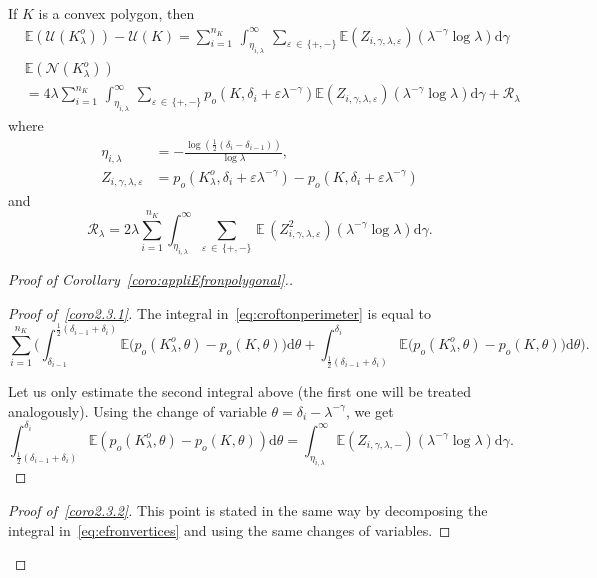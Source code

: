 \documentclass[10pt]{amsart}
\theoremstyle{definition}\newtheorem{defi}[theo]{Definition}\newtheorem{rema}[theo]{Remark}\newtheorem{exam}[theo]{Example}\newtheorem{exem}[theo]{Example}\newtheorem{nota}[theo]{Notation}
\newcommand{\cN}{\mathcal{N}}
\newcommand{\cR}{\mathcal{R}}
\newcommand{\cU}{\mathcal{U}}
\newcommand{\dd}{\mathrm{d}}
\newcommand{\E}{\mathbb{E}}
\newcommand{\eps}{\varepsilon}
\newcommand{\noi}{\noindent}
\newenvironment*{prooff}{\begin{proof}}{\let\qed\relax\end{proof}}
\newenvironment*{lastprooff}{\begin{proof}}{\end{proof}}
\begin{document}
\begin{coro}\label{coro:appliEfronpolygonal}
If $K$ is a convex polygon, then
\begin{align}
\tag{$\rm i$}\label{coro2.3.1} &\E(\cU(K_{\lambda}^o))-\cU(K) = \sum_{i=1}^{n_K}\,\int_{\eta_{i,\lambda}}^{\infty}\,\sum_{\varepsilon\,\in\,\{+,-\}} \E\left(Z_{i,\gamma,\lambda,\eps}\right)(\lambda^{-\gamma}\log \lambda)\dd\gamma \\
\tag{$\rm ii$}\label{coro2.3.2}  &\E(\cN(K_{\lambda}^o))\\
&= 4\lambda\sum_{i=1}^{n_K}\,\int_{\eta_{i,\lambda}}^{\infty}\,\sum_{\varepsilon\,\in\,\{+,-\}}p_o\left(K,\delta_i+\varepsilon\lambda^{-\gamma}\right)
\E(Z_{i,\gamma,\lambda,\eps})\left(\lambda^{-\gamma}\log\lambda\right)\dd\gamma+{\cR}_\lambda\nonumber
\end{align}
where
\begin{align*}
\eta_{i,\lambda}&=-\frac{\log \left(\frac{1}{2}(\delta_i-\delta_{i-1})\right)}{\log\lambda},\\
Z_{i,\gamma,\lambda,\eps}&= p_o\left(K_{\lambda}^o,\delta_i+\varepsilon\lambda^{-\gamma}\right)-p_o\left(K,\delta_i+\varepsilon\lambda^{-\gamma}\right)
\end{align*}
and
\begin{equation}\label{eq:defRlambdapolyg}
{\cR}_\lambda=2\lambda \sum_{i=1}^{n_K} \int_{\eta_{i,\lambda}}^{\infty} \sum_{\varepsilon\,\in\,\{+,-\}}\,\E\,\left(Z_{i,\gamma,\lambda,\eps}^2\right)\left(\lambda^{-\gamma}\log \lambda\right)\dd\gamma.
\end{equation}
\end{coro}

\begin{proof}[{Proof of Corollary~\ref{coro:appliEfronpolygonal}.}]

\begin{prooff}[{Proof of~\eqref{coro2.3.1}}]
The integral in~\eqref{eq:croftonperimeter} is equal to
\[
\sum_{i=1}^{n_K} \bigg(\int_{\delta_{i-1}}^{\frac1{2}\left(\delta_{i-1}+\delta_{i}\right)} \E\big(p_o(K_{\lambda}^o,\theta)-p_o(K,\theta)\big)\dd\theta + \int_{\frac1{2}\left(\delta_{i-1}+\delta_{i}\right)}^{\delta_{i}} \E\big(p_o(K_{\lambda}^o,\theta)-p_o(K,\theta)\big)\dd\theta\bigg).
\]

Let us only estimate the second integral above (the first one will be treated analogously). Using the change of variable $\theta=\delta_i-\lambda^{-\gamma}$, we get
\begin{equation*}\label{eq:perimpolyginterm0}
\int_{\frac1{2}\left(\delta_{i-1}+\delta_i\right)}^{\delta_i} \E(p_o(K_{\lambda}^o,\theta)-p_o(K,\theta))\dd\theta = \int_{\eta_{i,\lambda}}^{\infty} \E(Z_{i,\gamma,\lambda,-})(\lambda^{-\gamma}\log \lambda)\dd\gamma.
\end{equation*}
\end{prooff}
\begin{lastprooff}[{Proof of~\eqref{coro2.3.2}}]
This point is stated in the same way by decomposing the integral in~\eqref{eq:efronvertices} and using the same changes of variables.
\end{lastprooff}\let\qed\relax
\end{proof}
\end{document}
